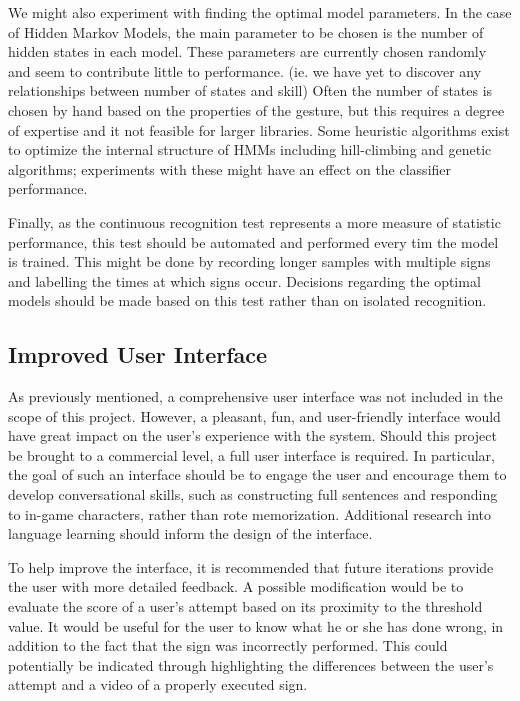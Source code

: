 \documentclass[12pt]{article}
\begin{document}
We might also experiment with finding the optimal model parameters. In the case of Hidden Markov Models, the main parameter to be chosen is the number of hidden states in each model. These parameters are currently chosen randomly and seem to contribute little to performance. (ie. we have yet to discover any relationships between number of states and skill) Often the number of states is chosen by hand based on the properties of the gesture, but this requires a degree of expertise and it not feasible for larger libraries. Some heuristic algorithms exist to optimize the internal structure of HMMs including hill-climbing\cite{opto1} and genetic algorithms\cite{opto2}; experiments with these might have an effect on the classifier performance.

Finally, as the continuous recognition test represents a more measure of statistic performance, this test should be automated and performed every tim the model is trained. This might be done by recording longer samples with multiple signs and labelling the times at which signs occur. Decisions regarding the optimal models should be made based on this test rather than on isolated recognition.

\subsection{Improved User Interface}
As previously mentioned, a comprehensive user interface was not included in the scope of this project. However, a pleasant, fun, and user-friendly interface would have great impact on the user’s experience with the system. Should this project be brought to a commercial level, a full user interface is required. In particular, the goal of such an interface should be to engage the user and encourage them to develop conversational skills, such as constructing full sentences and responding to in-game characters, rather than rote memorization. Additional research into language learning should inform the design of the interface.

To help improve the interface, it is recommended that future iterations provide the user with more detailed feedback. A possible modification would be to evaluate the score of a user’s attempt based on its proximity to the threshold value. It would be useful for the user to know what he or she has done wrong, in addition to the fact that the sign was incorrectly performed. This could potentially be indicated through highlighting the differences between the user’s attempt and a video of a properly executed sign.
\end{document}
